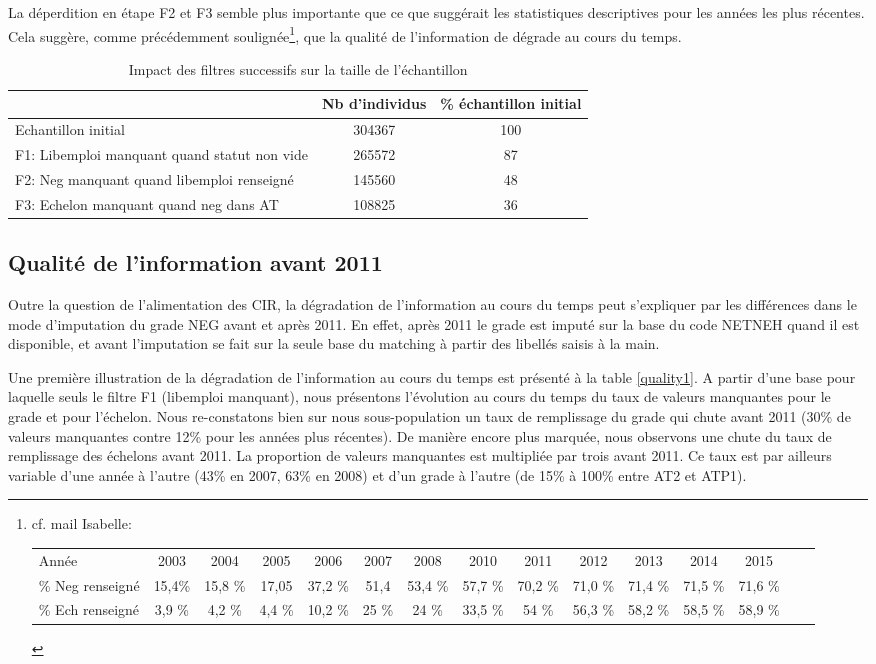 \documentclass[11pt,a4paper]{article}
\begin{document}
La déperdition en étape F2 et F3 semble plus importante que ce que suggérait les statistiques descriptives pour les années les plus récentes. Cela suggère, comme précédemment soulignée\footnote{cf. mail Isabelle:  \\
\scriptsize
\begin{tabular}{lcccccccccccccc}
Année &2003&	2004 &	2005&	2006&	2007&	2008	&2010	&2011	&2012	&2013	&2014	&2015 \\
\% Neg renseigné & 15,4\%&	15,8 \% &	17,05	& 37,2 \%	&51,4 &	53,4 \% &	57,7 \%&	70,2 \%&	71,0 \% & 	71,4 \%	&71,5 \%&	71,6 \% \\
\% Ech renseigné &  3,9 \%	& 4,2 \%&	4,4 \%	&10,2 \% 	&25 \%	&24 \%	&33,5 \% &	54 \%&	56,3 \%&	58,2 \%	&58,5 \%	&58,9 \% \\
\end{tabular}
}, que la qualité de l'information de dégrade au cours du temps. 


\begin{table}[h!]
\centering
\caption{Impact des filtres successifs sur la taille de l'échantillon} 
\label{filters}
\begin{tabular}{lcc}
\toprule
 & Nb d'individus & \% échantillon initial \\ 
  \hline
Echantillon initial & 304367 & 100 \\ 
F1: Libemploi manquant quand statut non vide & 265572 & 87 \\ 
  F2: Neg manquant quand libemploi renseigné & 145560 & 48 \\ 
  F3: Echelon manquant quand neg dans AT & 108825 & 36 \\ 
\bottomrule
\end{tabular}
\end{table}



\subsection{Qualité de l'information avant 2011}

Outre la question de l'alimentation des CIR, la dégradation de l'information au cours du temps peut s'expliquer par les différences dans le mode d'imputation du grade NEG avant et après 2011. En effet, après 2011 le grade est imputé sur la base du code NETNEH quand il est disponible, et avant l'imputation se fait sur la seule base du matching à partir des libellés saisis à la main. 

Une première illustration de la dégradation de l'information au cours du temps est présenté à la table \ref{quality1}. A partir d'une base pour laquelle seuls le filtre F1 (libemploi manquant), nous présentons l'évolution au cours du temps du taux de valeurs manquantes pour le grade et pour l'échelon. 
Nous re-constatons bien sur nous sous-population un taux de remplissage du grade qui chute avant 2011 (30\% de valeurs manquantes contre 12\% pour les années plus récentes). De manière encore plus marquée, nous observons une chute du taux de remplissage des échelons avant 2011. La proportion de valeurs manquantes est multipliée par trois avant 2011. Ce taux est par ailleurs variable d'une année à l'autre (43\% en 2007, 63\% en 2008) et d'un grade à l'autre (de 15\% à 100\% entre AT2 et ATP1). 
\end{document}
